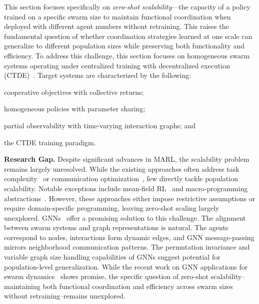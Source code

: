 This section focuses specifically on \emph{zero-shot scalability}---the capacity 
 of a policy trained on a specific swarm size to maintain functional coordination when deployed 
 with different agent numbers without retraining. 
%
This raises the fundamental question of whether coordination strategies learned at one scale 
 can generalize to different population sizes while preserving both functionality and efficiency.
%
To address this challenge, 
 this section focuses on homogeneous swarm systems operating under centralized training 
 with decentralized execution (CTDE)~\cite{DBLP:conf/atal/SosicKZK17}.
%
Target systems are characterized by the following: 
\begin{enumerate*}[label=(\roman*)]
    \item cooperative objectives with collective returns;
    \item homogeneous policies with parameter sharing;
    \item partial observability with time-varying interaction graphs; and
    \item the CTDE training paradigm.
\end{enumerate*}

\textbf{Research Gap.}
Despite significant advances in \gls{MARL}, 
 the scalability problem remains largely unresolved. 
%
While the existing approaches often address task complexity~\cite{DBLP:conf/dsrt/DominiAPV24} 
 or communication optimization~\cite{DBLP:conf/sac/MalucelliDAV25}, 
 few directly tackle population scalability. 
%
Notable exceptions include mean-field RL~\cite{DBLP:conf/icml/YangLLZZWY18} 
 and macro-programming abstractions~\cite{DBLP:journals/scp/DominiCAV24}. 
%
However, 
 these approaches either impose restrictive assumptions or require domain-specific programming, 
 leaving zero-shot scaling largely unexplored.
%
\glspl{GNN}~\cite{DBLP:journals/tnn/WuPCLZY21} 
 offer a promising solution to this challenge.
% 
The alignment between swarm systems and graph representations is natural. 
%
The agents correspond to nodes, interactions form dynamic edges, 
 and \gls{GNN} message-passing mirrors neighborhood communication patterns. 
%
The permutation invariance and variable graph size handling capabilities 
 of \glspl{GNN} suggest potential for population-level generalization.
%
While the recent work on \gls{GNN} applications for swarm dynamics~\cite{DBLP:conf/acsos/AguzziVE23} shows promise, 
 the specific question of zero-shot scalability--maintaining both functional coordination 
 and efficiency across swarm sizes without retraining--remains unexplored.

